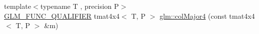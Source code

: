 \begin{DoxyCompactItemize}
\item 
{\footnotesize template$<$typename T , precision P$>$ }\\\mbox{\hyperlink{setup_8hpp_a33fdea6f91c5f834105f7415e2a64407}{G\+L\+M\+\_\+\+F\+U\+N\+C\+\_\+\+Q\+U\+A\+L\+I\+F\+I\+ER}} tmat4x4$<$ T, P $>$ \mbox{\hyperlink{group__gtx__matrix__major__storage_ga7592acfd27da055e2d7c39564cf8803d}{glm\+::col\+Major4}} (const tmat4x4$<$ T, P $>$ \&m)
\end{DoxyCompactItemize}

